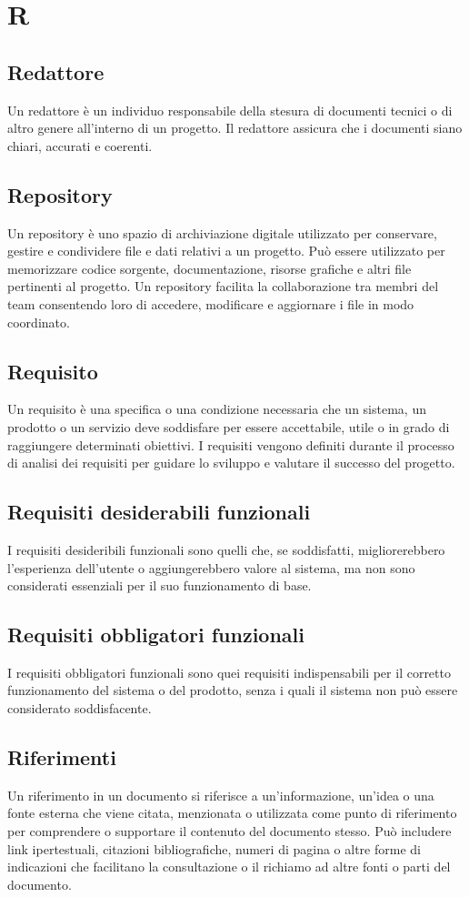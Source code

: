 \section*{R} 
\subsection*{Redattore} 
Un redattore è un individuo responsabile della stesura di documenti tecnici o di altro genere all'interno di un progetto. Il redattore assicura che i documenti siano chiari, accurati e coerenti. 
\subsection*{Repository} 
Un repository è uno spazio di archiviazione digitale utilizzato per conservare, gestire e condividere file e dati relativi a un progetto. Può essere utilizzato per memorizzare codice sorgente, documentazione, risorse grafiche e altri file pertinenti al progetto. Un repository facilita la collaborazione tra membri del team consentendo loro di accedere, modificare e aggiornare i file in modo coordinato. 
\subsection*{Requisito} 
Un requisito è una specifica o una condizione necessaria che un sistema, un prodotto o un servizio deve soddisfare per essere accettabile, utile o in grado di raggiungere determinati obiettivi. I requisiti vengono definiti durante il processo di analisi dei requisiti per guidare lo sviluppo e valutare il successo del progetto. 
\subsection*{Requisiti desiderabili funzionali} 
I requisiti desideribili funzionali sono quelli che, se soddisfatti, migliorerebbero l'esperienza dell'utente o aggiungerebbero valore al sistema, ma non sono considerati essenziali per il suo funzionamento di base. 
\subsection*{Requisiti obbligatori funzionali} 
I requisiti obbligatori funzionali sono quei requisiti indispensabili per il corretto funzionamento del sistema o del prodotto, senza i quali il sistema non può essere considerato soddisfacente. 
\subsection*{Riferimenti} 
Un riferimento in un documento si riferisce a un'informazione, un'idea o una fonte esterna che viene citata, menzionata o utilizzata come punto di riferimento per comprendere o supportare il contenuto del documento stesso. Può includere link ipertestuali, citazioni bibliografiche, numeri di pagina o altre forme di indicazioni che facilitano la consultazione o il richiamo ad altre fonti o parti del documento. 
